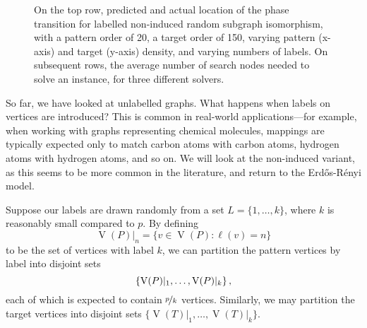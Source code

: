 \documentclass[twoside,11pt]{article}
\begin{document}
\begin{figure}[t]
    \caption{On the top row, predicted and actual location of the phase transition for labelled
    non-induced random subgraph isomorphism, with a pattern order of 20, a target order of 150,
    varying pattern (x-axis) and target (y-axis) density, and varying numbers of labels. On
    subsequent rows, the average number of search nodes needed to solve an instance, for three
    different solvers.}\label{figure:labels}
\end{figure}

So far, we have looked at unlabelled graphs. What happens when labels on vertices are introduced?
This is common in real-world applications---for example, when working with graphs representing
chemical molecules, mappings are typically expected only to match carbon atoms with carbon atoms,
hydrogen atoms with hydrogen atoms, and so on.  We will look at the non-induced variant, as this
seems to be more common in the literature, and return to the Erd\H{o}s-R\'enyi model.

Suppose our labels are drawn randomly from a set $L = \{ 1, \ldots, k \}$, where $k$ is reasonably
small compared to $p$. By defining \[ \operatorname{V}(P)\vert_n = \{ v \in \operatorname{V}(P) :
\ell(v) = n \} \] to be the set of vertices with label $k$, we can partition the pattern
vertices by label into disjoint sets \[\{ \operatorname{V}(P)\vert_1, \ldots,
\operatorname{V}(P)\vert_k \}\textnormal{\,,}\] each of which is expected to contain
$\nicefrac{p}{k}$ vertices. Similarly, we may partition the target vertices into disjoint
sets $\{ \operatorname{V}(T)\vert_1, \ldots, \operatorname{V}(T)\vert_k \}$.
\end{document}
